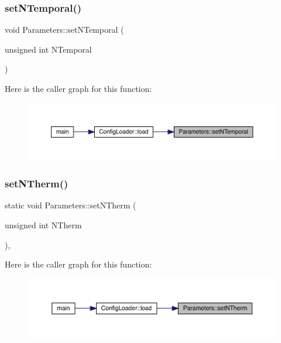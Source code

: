 \subsubsection{\texorpdfstring{setNTemporal()}{setNTemporal()}}
{\footnotesize\ttfamily void Parameters\+::set\+N\+Temporal (\begin{DoxyParamCaption}\item[{unsigned int}]{N\+Temporal }\end{DoxyParamCaption})\hspace{0.3cm}{\ttfamily [static]}}

Here is the caller graph for this function\+:
\nopagebreak
\begin{figure}[H]
\begin{center}
\leavevmode
\includegraphics[width=350pt]{class_parameters_a8b9ea6055d41cd08a060bc72332a63af_icgraph}
\end{center}
\end{figure}
\mbox{\label{class_parameters_a97a1e5d00965cf1d552a8c8dbb45cd53}} 
\subsubsection{\texorpdfstring{setNTherm()}{setNTherm()}}
{\footnotesize\ttfamily static void Parameters\+::set\+N\+Therm (\begin{DoxyParamCaption}\item[{unsigned int}]{N\+Therm }\end{DoxyParamCaption})\hspace{0.3cm}{\ttfamily [inline]}, {\ttfamily [static]}}

Here is the caller graph for this function\+:
\nopagebreak
\begin{figure}[H]
\begin{center}
\leavevmode
\includegraphics[width=350pt]{class_parameters_a97a1e5d00965cf1d552a8c8dbb45cd53_icgraph}
\end{center}
\end{figure}
\mbox{\label{class_parameters_ae443546fea1f1ceaf3683cb368f7f5bb}} 
